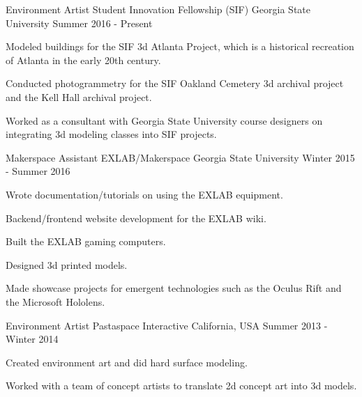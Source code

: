 

\begin{cventries}

  \cventry
    {Environment Artist} %
	{Student Innovation Fellowship (SIF)} %
    {Georgia State University} %
    {Summer 2016 - Present} %
    {
      \begin{cvitems} %
        \item {Modeled buildings for the SIF 3d Atlanta Project, which is a historical recreation of Atlanta in the early 20th century.}
        \item {Conducted photogrammetry for the SIF Oakland Cemetery 3d archival project and the Kell Hall archival project.}
        \item {Worked as a consultant with Georgia State University course designers on integrating 3d modeling classes into SIF projects.}
      \end{cvitems}
    }

  \cventry
    {Makerspace Assistant} %
	{EXLAB/Makerspace} %
    {Georgia State University} %
    {Winter 2015 - Summer 2016} %
    {
      \begin{cvitems} %
        \item {Wrote documentation/tutorials on using the EXLAB equipment.}
        \item {Backend/frontend website development for the EXLAB wiki.}
		\item {Built the EXLAB gaming computers.}
		\item {Designed 3d printed models.}
		\item {Made showcase projects for emergent technologies such as the Oculus Rift and the Microsoft Hololens.}
      \end{cvitems}
    }

  \cventry
	{Environment Artist} %
    {Pastaspace Interactive} %
    {California, USA} %
    {Summer 2013 - Winter 2014} %
    {
      \begin{cvitems} %
        \item {Created environment art and did hard surface modeling.}
        \item {Worked with a team of concept artists to translate 2d concept art into 3d models.}
      \end{cvitems}
    }
\end{cventries}

